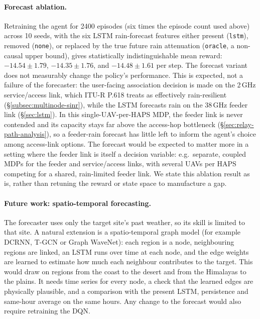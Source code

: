 \documentclass[conference]{IEEEtran}
\begin{document}
\paragraph{Forecast ablation.} Retraining the agent for 2400 episodes (six times the episode count used above) across 10 seeds, with the six LSTM rain-forecast features either present (\texttt{lstm}), removed (\texttt{none}), or replaced by the true future rain attenuation (\texttt{oracle}, a non-causal upper bound), gives statistically indistinguishable mean reward: $-14.54\pm1.79$, $-14.35\pm1.76$, and $-14.48\pm1.61$ per step. The forecast variant does not measurably change the policy's performance. This is expected, not a failure of the forecaster: the user-facing association decision is made on the 2\,GHz service/access link, which ITU-R P.618 treats as effectively rain-resilient (\S\ref{subsec:multinode-sinr}), while the LSTM forecasts rain on the 38\,GHz feeder link (\S\ref{sec:lstm}). In this single-UAV-per-HAPS MDP, the feeder link is never contended and its capacity stays far above the access-hop bottleneck (\S\ref{sec:relay-path-analysis}), so a feeder-rain forecast has little left to inform the agent's choice among access-link options. The forecast would be expected to matter more in a setting where the feeder link is itself a decision variable: e.g.\ separate, coupled MDPs for the feeder and service/access links, with several UAVs per HAPS competing for a shared, rain-limited feeder link. We state this ablation result as is, rather than retuning the reward or state space to manufacture a gap.

\paragraph{Future work: spatio-temporal forecasting.} The forecaster uses only the target site's past weather, so its skill is limited to that site. A natural extension is a spatio-temporal graph model (for example DCRNN, T-GCN or Graph WaveNet): each region is a node, neighbouring regions are linked, an LSTM runs over time at each node, and the edge weights are learned to estimate how much each neighbour contributes to the target. This would draw on regions from the coast to the desert and from the Himalayas to the plains. It needs time series for every node, a check that the learned edges are physically plausible, and a comparison with the present LSTM, persistence and same-hour average on the same hours. Any change to the forecast would also require retraining the DQN.
\end{document}

